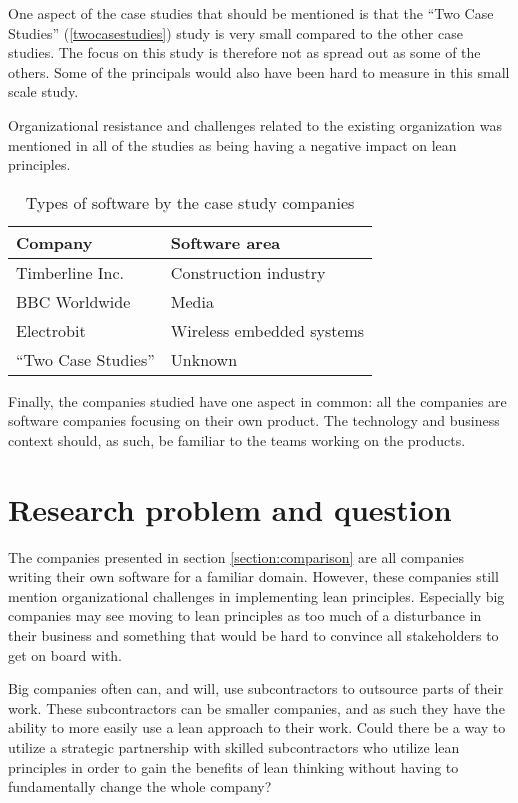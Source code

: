 One aspect of the case studies that should be mentioned is that the  ``Two Case Studies'' (\ref{twocasestudies}) study is very small compared to the other case studies. The focus on this study is therefore not as spread out as some of the others. Some of the principals would also have been hard to measure in this small scale study.

Organizational resistance and challenges related to the existing organization was mentioned in all of the studies as being having a negative impact on lean principles.

\begin{table}
  \begin{tabular}{ | l | l |}
    \hline
    \textbf{Company} & \textbf{Software area} \\
    \hline
    Timberline Inc. & Construction industry \\
    \hline
    BBC Worldwide & Media \\
    \hline
    Electrobit & Wireless embedded systems \\
    \hline
    ``Two Case Studies'' & Unknown \\
    \hline
  \end{tabular}
  \caption{Types of software by the case study companies}
  \label{tbl:softwarearea}
\end{table}

Finally, the companies studied have one aspect in common: all the companies are software companies focusing on their own product. The technology and business context should, as such, be familiar to the teams working on the products.

\section{Research problem and question}
\label{section:problem}

The companies presented in section \ref{section:comparison} are all companies writing their own software for a familiar domain. However, these companies still mention organizational challenges in implementing lean principles. Especially big companies may see moving to lean principles as too much of a disturbance in their business and something that would be hard to convince all stakeholders to get on board with.

Big companies often can, and will, use subcontractors to outsource parts of their work. These subcontractors can be smaller companies, and as such they have the ability to more easily use a lean approach to their work. Could there be a way to utilize a strategic partnership with skilled subcontractors who utilize lean principles in order to gain the benefits of lean thinking without having to fundamentally change the whole company?


